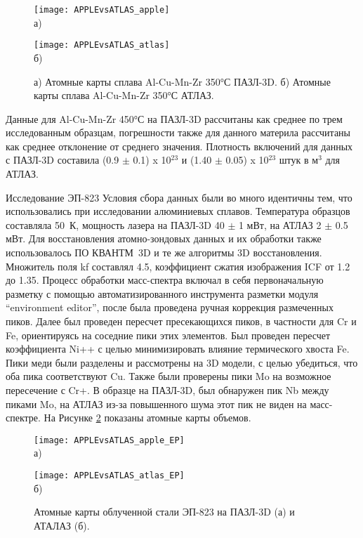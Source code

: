 \begin{figure}[h!tb]
	\begin{minipage}[b][][b]{0.49\textwidth}\centering
		\texttt{[image: APPLEvsATLAS\_apple]} \\ а)
	\end{minipage}
	\begin{minipage}[b][][b]{0.49\textwidth}\centering
		\texttt{[image: APPLEvsATLAS\_atlas]} \\ б)
	\end{minipage}
	\caption{а) Атомные карты сплава Al-Cu-Mn-Zr 350°С ПАЗЛ-3D. б) Атомные карты сплава Al-Cu-Mn-Zr 350°С АТЛАЗ.}
	\label{fig:APPLEvsATLAS}
\end{figure} 

Данные для Al-Cu-Mn-Zr 450°С на ПАЗЛ-3D рассчитаны как среднее по трем исследованным образцам, погрешности также для данного материла рассчитаны как среднее отклонение от среднего значения. Плотность включений для данных с ПАЗЛ-3D составила (0.9 $\pm$ 0.1) x 10$^{23}$ и (1.40 $\pm$ 0.05) x 10$^{23}$ штук в м$^3$ для АТЛАЗ.

Исследование ЭП-823
Условия сбора данных были во много идентичны тем, что использовались при исследовании алюминиевых сплавов. Температура образцов составляла 50~К, мощность лазера на ПАЗЛ-3D 40 $\pm$ 1 мВт, на АТЛАЗ 2 $\pm$ 0.5 мВт. Для восстановления атомно-зондовых данных и их обработки также использовалось ПО КВАНТМ~3D и те же алгоритмы 3D восстановления. Множитель поля kf составлял 4.5, коэффициент сжатия изображения ICF от 1.2 до 1.35. Процесс обработки масс-спектра включал в себя первоначальную разметку с помощью автоматизированного инструмента разметки модуля “environment editor”, после была проведена ручная коррекция размеченных пиков. Далее был проведен пересчет пресекающихся пиков, в частности для Cr и Fe, ориентируясь на соседние пики этих элементов. Был проведен пересчет коэффициента Ni++ с целью минимизировать влияние термического хвоста Fe. Пики меди были разделены и рассмотрены на 3D модели, с целью убедиться, что оба пика соответствуют Cu. Также были проверены пики Mo на возможное пересечение с Cr+. В образце на ПАЗЛ-3D, был обнаружен пик Nb между пиками Mo, на АТЛАЗ из-за повышенного шума этот пик не виден на масс-спектре. На Рисунке \cref{fig:APPLEvsATLAS_EP} показаны атомные карты объемов.

\begin{figure}[h!tb]
	\begin{minipage}[b][][b]{0.49\textwidth}\centering
		\texttt{[image: APPLEvsATLAS\_apple\_EP]} \\ а)
	\end{minipage}
	\begin{minipage}[b][][b]{0.49\textwidth}\centering
		\texttt{[image: APPLEvsATLAS\_atlas\_EP]} \\ б)
	\end{minipage}
	\caption{Атомные карты облученной стали ЭП-823 на ПАЗЛ-3D (а) и АТАЛАЗ (б).}
	\label{fig:APPLEvsATLAS_EP}
\end{figure} 


